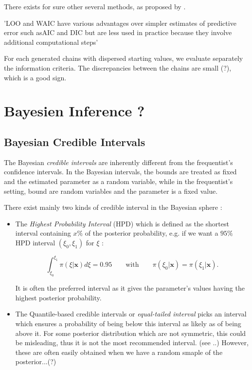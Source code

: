\documentclass[11pt,a4paper,openany ]{book}
\begin{document}
There exists for sure other several methods, as proposed by \citet{gelman_understanding_2014}.
 
 'LOO and WAIC have various advantages over simpler estimates of predictive error such asAIC and DIC but are less used in practice because they involve additional computational steps' 


For each generated chains with dispersed starting values, we evaluate separately the information criteria. The discrepancies between the chains are small (?), which is a good sign. 

\section{Bayesien Inference ?}

\subsection{Bayesian Credible Intervals}\label{bayes_cred_int}

The Bayesian \emph{credible intervals} are inherently different from the frequentist's confidence intervals. In the Bayesian intervals, the bounds are treated as fixed and the estimated parameter as a random variable, while in the frequentist's setting, bound are random variables and the parameter is a fixed value.

There exist mainly two kinds of credible interval in the Bayesian sphere : 

\begin{itemize}
	\item The \emph{Highest Probability Interval} (HPD) which is defined as the shortest interval containing $x\%$ of the posterior probability, e.g. if we want a $95\%$ HPD interval $(\xi_0,\xi_1)$ for $\xi$ :
	
	\begin{equation} 
	\int_{\xi_0}^{\xi_1}\pi(\xi|\boldsymbol{x})d\xi=0.95 \qquad\text{with}\qquad \pi(\xi_0|\boldsymbol{x})=\pi(\xi_1|\boldsymbol{x}).
	\end{equation}
	
	It is often the preferred interval as it gives the parameter's values having the highest posterior probability. 
	\item The Quantile-based credible intervals or \emph{equal-tailed interval} picks an interval which ensures a probability of being below this interval as likely as of being above it. 
	For some posterior distribution which are not symmetric, this could be misleading, thus it is not the most recommended interval. (see ..)
	However, these are often easily obtained when we have a random smaple of the posterior...(?)
\end{itemize}
\end{document}
